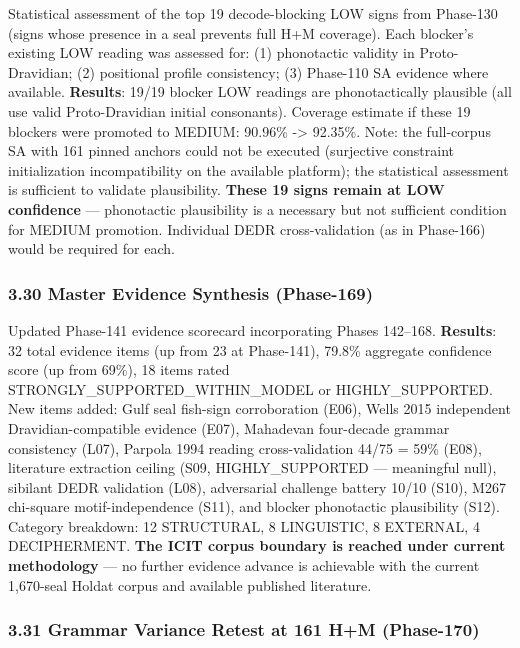 \documentclass[
]{article}
\begin{document}
Statistical assessment of the top 19 decode-blocking LOW signs from
Phase-130 (signs whose presence in a seal prevents full H+M coverage). Each
blocker's existing LOW reading was assessed for: (1) phonotactic
validity in Proto-Dravidian; (2) positional profile consistency;
(3) Phase-110 SA evidence where available. \textbf{Results}: 19/19
blocker LOW readings are phonotactically plausible (all use valid
Proto-Dravidian initial consonants). Coverage estimate if these 19
blockers were promoted to MEDIUM: 90.96\% -\textgreater{} 92.35\%. Note: the full-corpus
SA with 161 pinned anchors could not be executed (surjective constraint
initialization incompatibility on the available platform); the statistical
assessment is sufficient to validate plausibility. \textbf{These 19
signs remain at LOW confidence} --- phonotactic plausibility is a
necessary but not sufficient condition for MEDIUM promotion. Individual
DEDR cross-validation (as in Phase-166) would be required for each.

\subsubsection{3.30 Master Evidence Synthesis
(Phase-169)}\label{master-evidence-synthesis-phase-169}

Updated Phase-141 evidence scorecard incorporating Phases 142--168.
\textbf{Results}: 32 total evidence items (up from 23 at Phase-141),
79.8\% aggregate confidence score (up from 69\%), 18 items rated
STRONGLY\_SUPPORTED\_WITHIN\_MODEL or HIGHLY\_SUPPORTED. New items added: Gulf seal fish-sign
corroboration (E06), Wells 2015 independent Dravidian-compatible evidence (E07),
Mahadevan four-decade grammar consistency (L07), Parpola 1994 reading
cross-validation 44/75 = 59\% (E08), literature extraction ceiling
(S09, HIGHLY\_SUPPORTED --- meaningful null), sibilant DEDR validation (L08),
adversarial challenge battery 10/10 (S10), M267 chi-square motif-independence
(S11), and blocker phonotactic plausibility (S12). Category breakdown:
12 STRUCTURAL, 8 LINGUISTIC, 8 EXTERNAL, 4 DECIPHERMENT.
\textbf{The ICIT corpus boundary is reached under current methodology} --- no further evidence
advance is achievable with the current 1,670-seal Holdat corpus and
available published literature.

\subsubsection{3.31 Grammar Variance Retest at 161 H+M
(Phase-170)}\label{grammar-variance-retest-phase-170}
\end{document}
